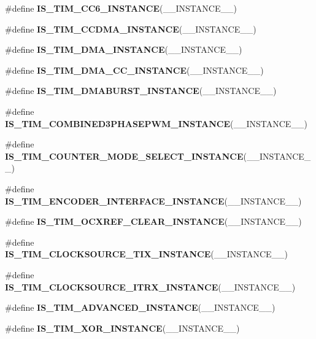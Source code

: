 \begin{DoxyCompactItemize}
\item 
\#define {\bfseries I\+S\+\_\+\+T\+I\+M\+\_\+\+C\+C6\+\_\+\+I\+N\+S\+T\+A\+N\+CE}(\+\_\+\+\_\+\+I\+N\+S\+T\+A\+N\+C\+E\+\_\+\+\_\+)
\item 
\#define {\bfseries I\+S\+\_\+\+T\+I\+M\+\_\+\+C\+C\+D\+M\+A\+\_\+\+I\+N\+S\+T\+A\+N\+CE}(\+\_\+\+\_\+\+I\+N\+S\+T\+A\+N\+C\+E\+\_\+\+\_\+)
\item 
\#define {\bfseries I\+S\+\_\+\+T\+I\+M\+\_\+\+D\+M\+A\+\_\+\+I\+N\+S\+T\+A\+N\+CE}(\+\_\+\+\_\+\+I\+N\+S\+T\+A\+N\+C\+E\+\_\+\+\_\+)
\item 
\#define {\bfseries I\+S\+\_\+\+T\+I\+M\+\_\+\+D\+M\+A\+\_\+\+C\+C\+\_\+\+I\+N\+S\+T\+A\+N\+CE}(\+\_\+\+\_\+\+I\+N\+S\+T\+A\+N\+C\+E\+\_\+\+\_\+)
\item 
\#define {\bfseries I\+S\+\_\+\+T\+I\+M\+\_\+\+D\+M\+A\+B\+U\+R\+S\+T\+\_\+\+I\+N\+S\+T\+A\+N\+CE}(\+\_\+\+\_\+\+I\+N\+S\+T\+A\+N\+C\+E\+\_\+\+\_\+)
\item 
\#define {\bfseries I\+S\+\_\+\+T\+I\+M\+\_\+\+C\+O\+M\+B\+I\+N\+E\+D3\+P\+H\+A\+S\+E\+P\+W\+M\+\_\+\+I\+N\+S\+T\+A\+N\+CE}(\+\_\+\+\_\+\+I\+N\+S\+T\+A\+N\+C\+E\+\_\+\+\_\+)
\item 
\#define {\bfseries I\+S\+\_\+\+T\+I\+M\+\_\+\+C\+O\+U\+N\+T\+E\+R\+\_\+\+M\+O\+D\+E\+\_\+\+S\+E\+L\+E\+C\+T\+\_\+\+I\+N\+S\+T\+A\+N\+CE}(\+\_\+\+\_\+\+I\+N\+S\+T\+A\+N\+C\+E\+\_\+\+\_\+)
\item 
\#define {\bfseries I\+S\+\_\+\+T\+I\+M\+\_\+\+E\+N\+C\+O\+D\+E\+R\+\_\+\+I\+N\+T\+E\+R\+F\+A\+C\+E\+\_\+\+I\+N\+S\+T\+A\+N\+CE}(\+\_\+\+\_\+\+I\+N\+S\+T\+A\+N\+C\+E\+\_\+\+\_\+)
\item 
\#define {\bfseries I\+S\+\_\+\+T\+I\+M\+\_\+\+O\+C\+X\+R\+E\+F\+\_\+\+C\+L\+E\+A\+R\+\_\+\+I\+N\+S\+T\+A\+N\+CE}(\+\_\+\+\_\+\+I\+N\+S\+T\+A\+N\+C\+E\+\_\+\+\_\+)
\item 
\#define {\bfseries I\+S\+\_\+\+T\+I\+M\+\_\+\+C\+L\+O\+C\+K\+S\+O\+U\+R\+C\+E\+\_\+\+T\+I\+X\+\_\+\+I\+N\+S\+T\+A\+N\+CE}(\+\_\+\+\_\+\+I\+N\+S\+T\+A\+N\+C\+E\+\_\+\+\_\+)
\item 
\#define {\bfseries I\+S\+\_\+\+T\+I\+M\+\_\+\+C\+L\+O\+C\+K\+S\+O\+U\+R\+C\+E\+\_\+\+I\+T\+R\+X\+\_\+\+I\+N\+S\+T\+A\+N\+CE}(\+\_\+\+\_\+\+I\+N\+S\+T\+A\+N\+C\+E\+\_\+\+\_\+)
\item 
\#define {\bfseries I\+S\+\_\+\+T\+I\+M\+\_\+\+A\+D\+V\+A\+N\+C\+E\+D\+\_\+\+I\+N\+S\+T\+A\+N\+CE}(\+\_\+\+\_\+\+I\+N\+S\+T\+A\+N\+C\+E\+\_\+\+\_\+)
\item 
\#define {\bfseries I\+S\+\_\+\+T\+I\+M\+\_\+\+X\+O\+R\+\_\+\+I\+N\+S\+T\+A\+N\+CE}(\+\_\+\+\_\+\+I\+N\+S\+T\+A\+N\+C\+E\+\_\+\+\_\+)

\end{DoxyCompactItemize}
